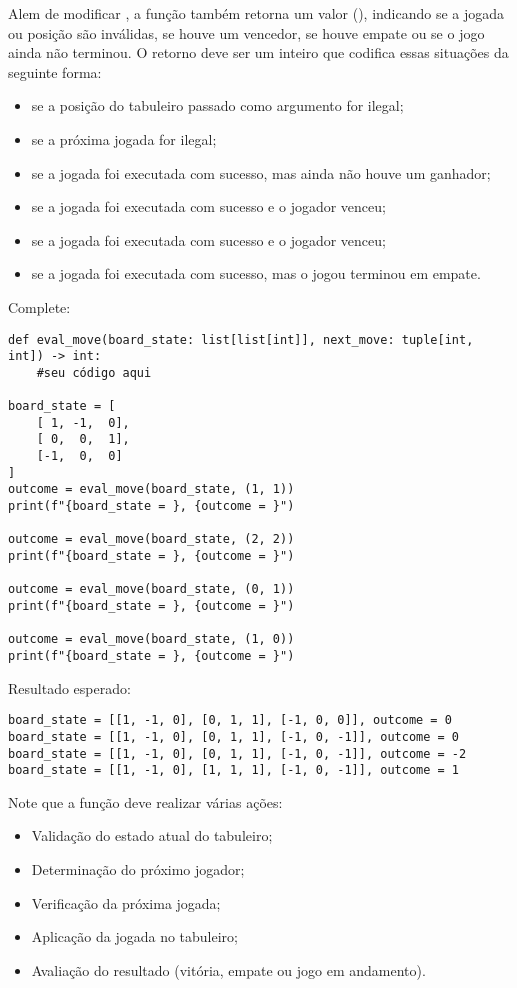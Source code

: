 Alem de modificar , a função também retorna um valor  (), indicando se a
jogada ou posição são inválidas, se houve um vencedor, se houve empate ou se o jogo ainda não terminou.
O retorno  deve ser um inteiro que codifica essas situações da seguinte forma:
\begin{itemize}
\item {} se a posição do tabuleiro passado como argumento for ilegal;
\item {} se a próxima jogada for ilegal;
\item {} se a jogada foi executada com sucesso, mas ainda não houve um ganhador;
\item {} se a jogada foi executada com sucesso e o jogador \1 venceu;
\item {} se a jogada foi executada com sucesso e o jogador \2 venceu;
\item {} se a jogada foi executada com sucesso, mas o jogou terminou em empate.
\end{itemize}

Complete:
\begin{verbatim}
def eval_move(board_state: list[list[int]], next_move: tuple[int, int]) -> int:
    #seu código aqui

board_state = [
    [ 1, -1,  0],
    [ 0,  0,  1],
    [-1,  0,  0]
]
outcome = eval_move(board_state, (1, 1))
print(f"{board_state = }, {outcome = }")

outcome = eval_move(board_state, (2, 2))
print(f"{board_state = }, {outcome = }")

outcome = eval_move(board_state, (0, 1))
print(f"{board_state = }, {outcome = }")

outcome = eval_move(board_state, (1, 0))
print(f"{board_state = }, {outcome = }")
\end{verbatim}

Resultado esperado:
\begin{verbatim}
board_state = [[1, -1, 0], [0, 1, 1], [-1, 0, 0]], outcome = 0
board_state = [[1, -1, 0], [0, 1, 1], [-1, 0, -1]], outcome = 0
board_state = [[1, -1, 0], [0, 1, 1], [-1, 0, -1]], outcome = -2
board_state = [[1, -1, 0], [1, 1, 1], [-1, 0, -1]], outcome = 1
\end{verbatim}

Note que a função deve realizar várias ações:
\begin{itemize}
\item Validação do estado atual do tabuleiro;
\item Determinação do próximo jogador;
\item Verificação da próxima jogada;
\item Aplicação da jogada no tabuleiro;
\item Avaliação do resultado (vitória, empate ou jogo em andamento).
\end{itemize}

